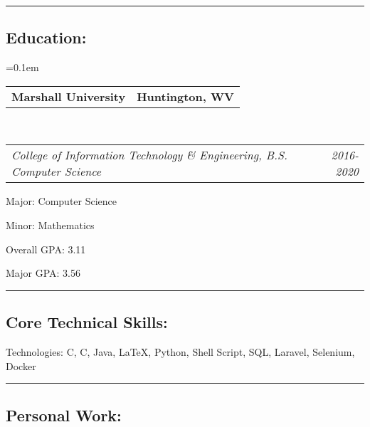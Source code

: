 \documentclass[11pt,letterpaper]{article}
\makeatletter
\newenvironment{indentsection}[1]%
{\begin{list}{}%
	{\setlength{\leftmargin}{#1}}%
	\item[]%
}
{\end{list}}
\newcommand{\headerrow}[2]
{\begin{tabular*}{\linewidth}{l@{\extracolsep{\fill}}r}
	#1 &
	#2 \\
\end{tabular*}}
\newcommand{\CPP}
{C\nolinebreak[4]\hspace{-.05em}\raisebox{.22ex}{\footnotesize\bf ++}}
\makeatother
\begin{document}


\hrule
\vspace{-0.4em}
\subsection*{\Large{Education:}}

	\parskip=0.1em

	\headerrow
		{\textbf{Marshall University}}
		{\textbf{Huntington, WV}}
	\\
	\headerrow
		{\emph{College of Information Technology \& Engineering, B.S. Computer Science}}
		{\emph{2016-2020}}
	\begin{itemize*}
		\item Major: Computer Science
		\item Minor: Mathematics
		\item Overall GPA: 3.11
		\item Major GPA: 3.56
	\end{itemize*}



\hrule
\vspace{-0.4em}
\subsection*{\Large{Core Technical Skills:}}

\begin{indentsection}{\parindent}
\begin{description*}
	\item[Technologies:]
	C, \CPP, Java, \LaTeX, Python, Shell Script, SQL, Laravel, Selenium, Docker
\end{description*}
\end{indentsection}

\hrule
\vspace{-0.4em}
\subsection*{\Large{Personal Work:}}
\end{document}
